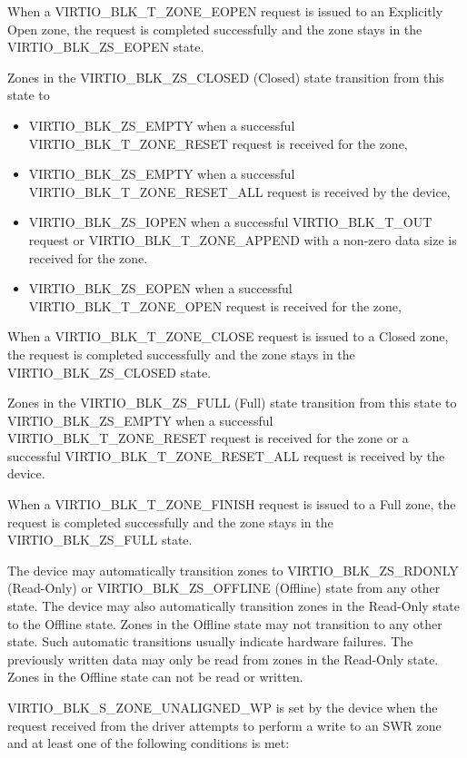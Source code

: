 When a VIRTIO_BLK_T_ZONE_EOPEN request is issued to an Explicitly Open zone, the
request is completed successfully and the zone stays in the VIRTIO_BLK_ZS_EOPEN
state.

Zones in the VIRTIO_BLK_ZS_CLOSED (Closed) state transition from this state
to
\begin{itemize}
\item VIRTIO_BLK_ZS_EMPTY when a successful VIRTIO_BLK_T_ZONE_RESET request is
    received for the zone,

\item VIRTIO_BLK_ZS_EMPTY when a successful VIRTIO_BLK_T_ZONE_RESET_ALL request
    is received by the device,

\item VIRTIO_BLK_ZS_IOPEN when a successful VIRTIO_BLK_T_OUT request or
    VIRTIO_BLK_T_ZONE_APPEND with a non-zero data size is received for the zone.

\item VIRTIO_BLK_ZS_EOPEN when a successful VIRTIO_BLK_T_ZONE_OPEN request is
    received for the zone,
\end{itemize}

When a VIRTIO_BLK_T_ZONE_CLOSE request is issued to a Closed zone, the request
is completed successfully and the zone stays in the VIRTIO_BLK_ZS_CLOSED state.

Zones in the VIRTIO_BLK_ZS_FULL (Full) state transition from this state to
VIRTIO_BLK_ZS_EMPTY when a successful VIRTIO_BLK_T_ZONE_RESET request is
received for the zone or a successful VIRTIO_BLK_T_ZONE_RESET_ALL request is
received by the device.

When a VIRTIO_BLK_T_ZONE_FINISH request is issued to a Full zone, the request
is completed successfully and the zone stays in the VIRTIO_BLK_ZS_FULL state.

The device may automatically transition zones to VIRTIO_BLK_ZS_RDONLY
(Read-Only) or VIRTIO_BLK_ZS_OFFLINE (Offline) state from any other state. The
device may also automatically transition zones in the Read-Only state to the
Offline state. Zones in the Offline state may not transition to any other state.
Such automatic transitions usually indicate hardware failures. The previously
written data may only be read from zones in the Read-Only state. Zones in the
Offline state can not be read or written.

VIRTIO_BLK_S_ZONE_UNALIGNED_WP is set by the device when the request received
from the driver attempts to perform a write to an SWR zone and at least one of
the following conditions is met:

